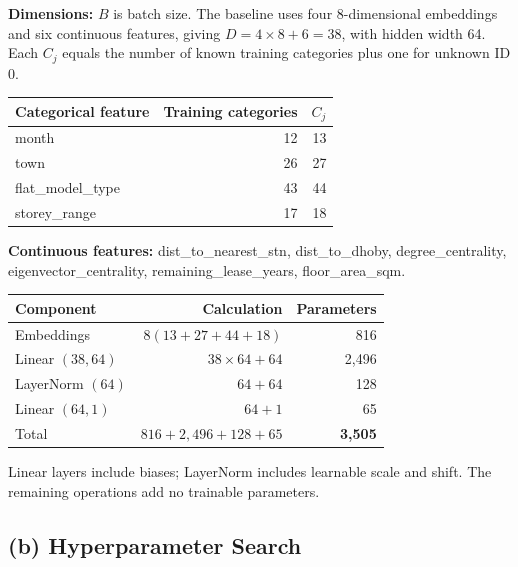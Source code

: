 \documentclass[10pt,a4paper]{article}
\begin{document}
\begin{center}
{%
}
\end{center}



\textbf{Dimensions:} $B$ is batch size. The baseline uses four 8-dimensional embeddings and six continuous features, giving $D=4\times8+6=38$, with hidden width 64. Each $C_j$ equals the number of known training categories plus one for unknown ID 0.
\begin{center}\small\begin{tabular}{lrr}\toprule Categorical feature & Training categories & $C_j$ \\ \midrule
month &12&13\\town&26&27\\flat\_model\_type&43&44\\storey\_range&17&18\\\bottomrule\end{tabular}\end{center}
\begingroup\small

\textbf{Continuous features:} dist\_to\_nearest\_stn, dist\_to\_dhoby, degree\_centrality, eigenvector\_centrality, remaining\_lease\_years, floor\_area\_sqm.\par\endgroup
\begin{center}\small\begin{tabular}{lrr}\toprule Component & Calculation & Parameters\\\midrule
Embeddings & $8(13+27+44+18)$ &816\\Linear $(38,64)$ &$38\times64+64$&2,496\\LayerNorm $(64)$ &$64+64$&128\\Linear $(64,1)$ &$64+1$&65\\\midrule Total &$816+2,496+128+65$&\textbf{3,505}\\\bottomrule\end{tabular}\end{center}
Linear layers include biases; LayerNorm includes learnable scale and shift. The remaining operations add no trainable parameters.
\subsection*{(b) Hyperparameter Search}
\end{document}

